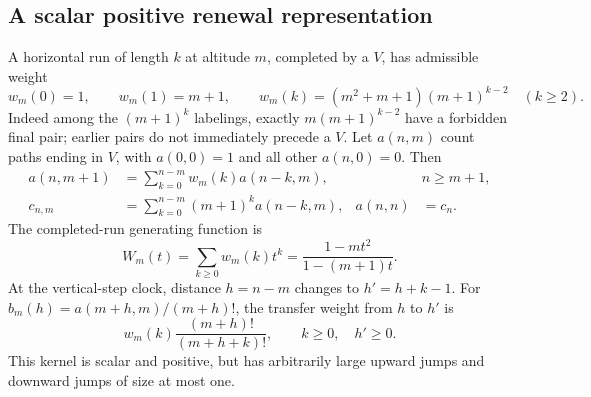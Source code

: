 \documentclass[11pt,letterpaper]{article}
\numberwithin{equation}{section}
\theoremstyle{remark}
\begin{document}
\subsection{A scalar positive renewal representation}
A horizontal run of length $k$ at altitude $m$, completed by a $V$, has
admissible weight
\begin{equation}\label{air:cb:eq:renewal-weights}
w_m(0)=1,\qquad w_m(1)=m+1,\qquad
w_m(k)=(m^2+m+1)(m+1)^{k-2}\quad(k\ge2).
\end{equation}
Indeed among the $(m+1)^k$ labelings, exactly $m(m+1)^{k-2}$ have a forbidden
final pair; earlier pairs do not immediately precede a $V$.
Let $a(n,m)$ count paths ending in $V$, with $a(0,0)=1$ and all other
$a(n,0)=0$. Then
\begin{equation}\label{air:cb:eq:renewal}
\begin{aligned}
a(n,m+1)&=\sum_{k=0}^{n-m}w_m(k)a(n-k,m),&&n\ge m+1,\\
c_{n,m}&=\sum_{k=0}^{n-m}(m+1)^k a(n-k,m),&
a(n,n)&=c_n.
\end{aligned}
\end{equation}
The completed-run generating function is
\[
W_m(t)=\sum_{k\ge0}w_m(k)t^k=\frac{1-mt^2}{1-(m+1)t}.
\]
At the vertical-step clock, distance $h=n-m$ changes to $h'=h+k-1$.
For $b_m(h)=a(m+h,m)/(m+h)!$, the transfer weight from $h$ to $h'$ is
\[
w_m(k)\frac{(m+h)!}{(m+h+k)!},\qquad k\ge0,\quad h'\ge0.
\]
This kernel is scalar and positive, but has arbitrarily large upward jumps
and downward jumps of size at most one.
\end{document}
